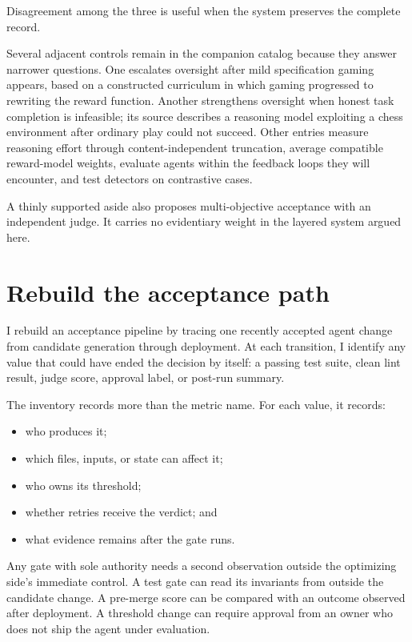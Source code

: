 Disagreement among the three is useful when the system preserves the complete record.

Several adjacent controls remain in the companion catalog because they answer narrower questions. One escalates oversight after mild specification gaming appears, based on a constructed curriculum in which gaming progressed to rewriting the reward function. Another strengthens oversight when honest task completion is infeasible; its source describes a reasoning model exploiting a chess environment after ordinary play could not succeed. Other entries measure reasoning effort through content-independent truncation, average compatible reward-model weights, evaluate agents within the feedback loops they will encounter, and test detectors on contrastive cases.

A thinly supported aside also proposes multi-objective acceptance with an independent judge. It carries no evidentiary weight in the layered system argued here.

\section{Rebuild the acceptance path}\label{rebuild-the-acceptance-path}

I rebuild an acceptance pipeline by tracing one recently accepted agent change from candidate generation through deployment. At each transition, I identify any value that could have ended the decision by itself: a passing test suite, clean lint result, judge score, approval label, or post-run summary.

The inventory records more than the metric name. For each value, it records:

\begin{itemize}
\tightlist
\item
  who produces it;
\item
  which files, inputs, or state can affect it;
\item
  who owns its threshold;
\item
  whether retries receive the verdict; and
\item
  what evidence remains after the gate runs.
\end{itemize}

Any gate with sole authority needs a second observation outside the optimizing side's immediate control. A test gate can read its invariants from outside the candidate change. A pre-merge score can be compared with an outcome observed after deployment. A threshold change can require approval from an owner who does not ship the agent under evaluation.

